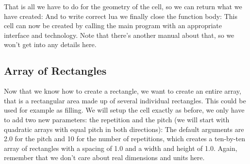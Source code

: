 That is all we have to do for the geometry of the cell, so we can return what we have created:
And to write correct lua we finally close the function body:
This cell can now be created by calling the main program with an appropriate interface and technology. Note that there's another manual about that, so we won't get
into any details here.

\subsection{Array of Rectangles}
Now that we know how to create a rectangle, we want to create an entire array, that is a rectangular area made up of several individual rectangles. This could be
used for example as filling. We will setup the cell exactly as before, we only have to add two new parameters: the repetition and the pitch (we will start with
quadratic arrays with equal pitch in both directions):
The default arguments are \num{2.0} for the pitch and \num{10} for the number of repetitions, which creates a ten-by-ten array of rectangles with a spacing of
\num{1.0} and a width and height of \num{1.0}. Again, remember that we don't care about real dimensions and units here.

